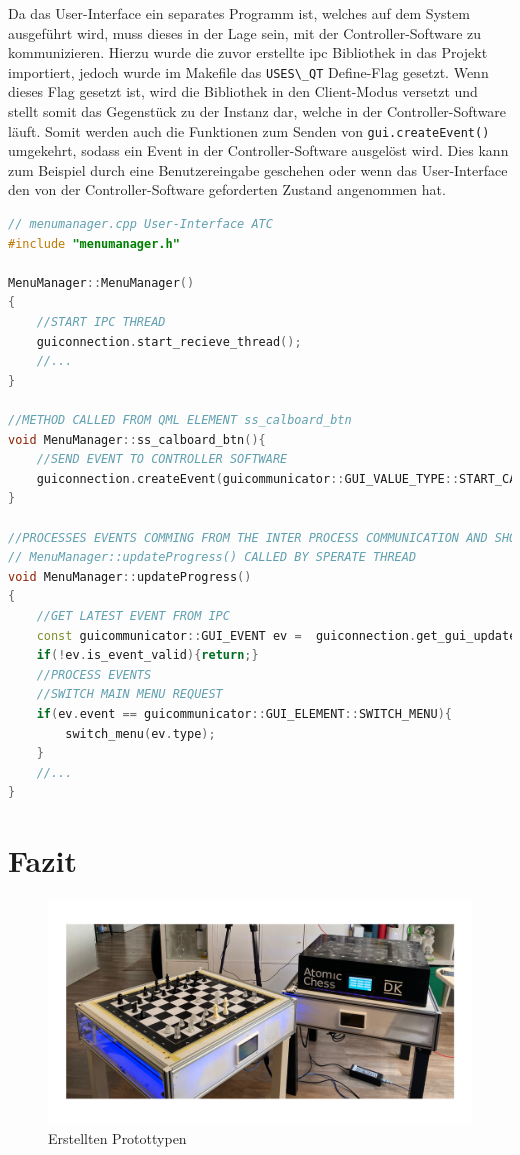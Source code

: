 Da das User-Interface ein separates Programm ist, welches auf dem System
ausgeführt wird, muss dieses in der Lage sein, mit der
Controller-Software zu kommunizieren. Hierzu wurde die zuvor erstellte
\gls{ipc} Bibliothek in das Projekt importiert, jedoch wurde im Makefile
das \passthrough{\lstinline!USES\_QT!} Define-Flag gesetzt. Wenn dieses
Flag gesetzt ist, wird die Bibliothek in den Client-Modus versetzt und
stellt somit das Gegenstück zu der Instanz dar, welche in der
Controller-Software läuft. Somit werden auch die Funktionen zum Senden
von \passthrough{\lstinline!gui.createEvent()!} umgekehrt, sodass ein
Event in der Controller-Software ausgelöst wird. Dies kann zum Beispiel
durch eine Benutzereingabe geschehen oder wenn das User-Interface den
von der Controller-Software geforderten Zustand angenommen hat.

\begin{lstlisting}[language={C++}]
// menumanager.cpp User-Interface ATC
#include "menumanager.h"

MenuManager::MenuManager()
{
    //START IPC THREAD
    guiconnection.start_recieve_thread();
    //...
}

//METHOD CALLED FROM QML ELEMENT ss_calboard_btn
void MenuManager::ss_calboard_btn(){
    //SEND EVENT TO CONTROLLER SOFTWARE
    guiconnection.createEvent(guicommunicator::GUI_VALUE_TYPE::START_CALBOARD_PROC);
}

//PROCESSES EVENTS COMMING FROM THE INTER PROCESS COMMUNICATION AND SHOWS MENUS OR SET IMAGES/LABES
// MenuManager::updateProgress() CALLED BY SPERATE THREAD
void MenuManager::updateProgress()
{
    //GET LATEST EVENT FROM IPC
    const guicommunicator::GUI_EVENT ev =  guiconnection.get_gui_update_event();
    if(!ev.is_event_valid){return;}
    //PROCESS EVENTS
    //SWITCH MAIN MENU REQUEST
    if(ev.event == guicommunicator::GUI_ELEMENT::SWITCH_MENU){
        switch_menu(ev.type);
    }
    //...
}
\end{lstlisting}

\hypertarget{fazit}{%
\chapter{Fazit}\label{fazit}}

\begin{figure}
\centering
\includegraphics{images/ATC_PROD_TABLE_FINAL_IMG.png}
\caption{Erstellten Protottypen \label{ATC_PROD_TABLE_FINAL_IMG}}
\end{figure}

